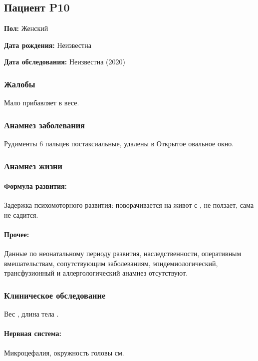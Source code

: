 \documentclass[a4paper,14pt]{extarticle}
\newcommand{\gramm}{г}
\newcommand{\cm}{см}
\newcommand{\months}{мес.}
\begin{document}
\newpage
\subsection*{Пациент P10}

\textbf{Пол:} Женский

\textbf{Дата рождения:} Неизвестна

\textbf{Дата обследования:} Неизвестна (2020)

\subsubsection*{Жалобы}

Мало прибавляет в весе.

\subsubsection*{Анамнез заболевания}

Рудименты 6 пальцев постаксиальные, удалены в \numprint[\months]{6}
Открытое овальное окно.

\subsubsection*{Анамнез жизни}

\paragraph{Формула развития:} Задержка психомоторного развития: поворачивается на живот с \numprint[\months]{6}, не ползает, сама не садится. 

\paragraph{Прочее:} Данные по неонатальному периоду развития, наследственности, оперативным вмешательствам, сопутствующим заболеваниям, эпидемиологический, трансфузионный и аллергологический анамнез отсутствуют.

\subsubsection*{Клиническое обследование}

Вес \numprint[\gramm]{3410}, длина тела \numprint[\cm]{53}.

\paragraph{Нервная система:} Микроцефалия, окружность головы \numprint[\cm]{42} см.
\end{document}
